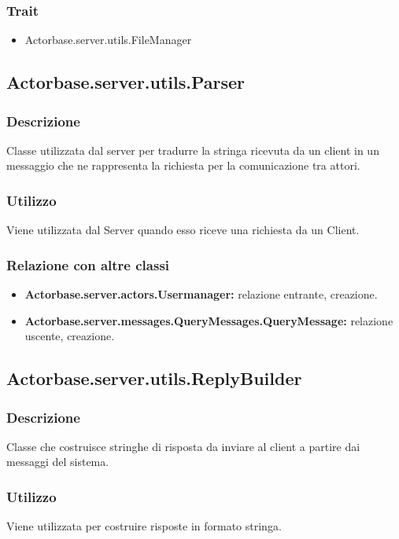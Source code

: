 \documentclass[a4paper]{article}
\begin{document}
			\subsubsection{Trait}
				\begin{itemize}
					\item Actorbase.server.utils.FileManager
				\end{itemize}
				
			
		\subsection{Actorbase.server.utils.Parser}
			\subsubsection{Descrizione}
				Classe utilizzata dal server per tradurre la stringa ricevuta da un client in un messaggio che ne rappresenta la richiesta per la 
				comunicazione tra attori.
				
			\subsubsection{Utilizzo}
				Viene utilizzata dal Server quando esso riceve una richiesta da un Client.
				
			\subsubsection{Relazione con altre classi}
			\begin{itemize}
				\item \textbf{Actorbase.server.actors.Usermanager:} relazione entrante, creazione.
				\item \textbf{Actorbase.server.messages.QueryMessages.QueryMessage:} relazione uscente, creazione. 
			\end{itemize}
			
				\subsection{Actorbase.server.utils.ReplyBuilder}
			\subsubsection{Descrizione}
				Classe che costruisce stringhe di risposta da inviare al client a partire dai messaggi del sistema.
				
			\subsubsection{Utilizzo}
				Viene utilizzata per costruire risposte in formato stringa.
				
\end{document}

